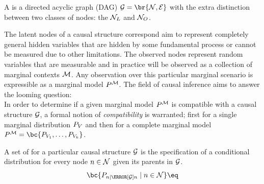 \documentclass[aps, 10pt, english, twoside, pra, nofootinbib, longbibliography]{revtex4-1}
\begin{document}
    \begin{definition}
        A  is a directed acyclic graph (DAG) $\graph = \br{\nodes, \edges}$ with the extra distinction between two classes of nodes: the  $\mathcal{N}_L$ and  $\mathcal{N}_O$.
    \end{definition}
    The latent nodes of a causal structure correspond aim to represent completely general hidden variables that are hidden by some fundamental process or cannot be measured due to other limitations. The observed nodes represent random variables that are measurable and in practice will be observed as a collection of marginal contexts $\mathcal{M}$. Any observation over this particular marginal scenario is expressible as a marginal model $\prob^{\mscenario}$. The field of causal inference aims to answer the looming question:  \\

    In order to determine if a given marginal model $\prob^{\mscenario}$ is compatible with a causal structure $\mathcal{G}$, a formal notion of \textit{compatibility} is warranted; first for a single marginal distribution $\prob[V]$ and then for a complete marginal model $\prob^{\mscenario} = \bc{\prob[V_1], \ldots, \prob[V_k]}$.

    \begin{definition}
        A set of  for a particular causal structure $\mathcal{G}$ is the specification of a conditional distribution for every node $n \in \mathcal{N}$ given its parents in $\mathcal{G}$.
        \[ \bc{\prob[n \mid \Pa[\graph]{n}] \mid n \in \nodes} \eq \label{eq:def:casual_param}\]
    \end{definition}
\end{document}
